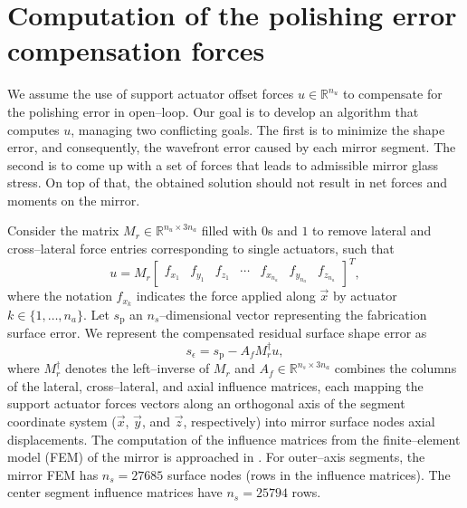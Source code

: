 \documentclass{gmto}
\begin{document}






\section{Computation of the polishing error compensation forces}
\label{sec:opt_method}

We assume the use of support actuator offset forces $u \in \mathbb{R}^{n_u}$ to compensate for the polishing error in open--loop. Our goal is to develop an algorithm that computes $u$, managing two conflicting goals. The first is to minimize the shape error, and consequently, the wavefront error caused by each mirror segment. The second is to come up with a set of forces that leads to admissible mirror glass stress. On top of that, the obtained solution should not result in net forces and moments on the mirror. 

Consider the matrix $M_r \in \mathbb{R}^{n_u \times 3n_a}$ filled with $0$s and $1$ to remove lateral and cross--lateral force entries corresponding to single actuators, such that
\begin{equation} \label{eq:alternative_u}
u = M_r
\begin{bmatrix}
f_{x_1} & f_{y_1} & f_{z_1} & \cdots & 
f_{x_{n_a}} & f_{y_{n_a}} & f_{z_{n_a}}
\end{bmatrix}^T,    
\end{equation}
where the notation $f_{x_k}$ indicates the force applied along $\vec{x}$ by actuator $k \in \{1,\ldots,n_a\}$. Let $s_{\text{p}}$ an $n_s$--dimensional vector representing the fabrication surface error. We represent the compensated residual surface shape error as 
%
\begin{equation}
\label{eq:surf_error}
s_\epsilon = s_{\text{p}} - A_f M_r^\dagger u,
\end{equation}
where $M_r^\dagger$ denotes the left--inverse of $M_r$ and $A_f \in \mathbb{R}^{n_s \times 3n_a}$ combines the columns of the lateral, cross--lateral, and axial influence matrices, each mapping the support actuator forces vectors along an orthogonal axis of the segment coordinate system ($\vec{x}$, $\vec{y}$, and $\vec{z}$, respectively) into mirror surface nodes axial displacements. The computation of the influence matrices from the finite--element model (FEM) of the mirror is approached in \cite[Section 3]{m1SupportF2017}. For outer--axis segments, the mirror FEM has $n_s = 27685$ surface nodes (rows in the influence matrices). The center segment influence matrices have $n_s = 25794$ rows.
\end{document}
